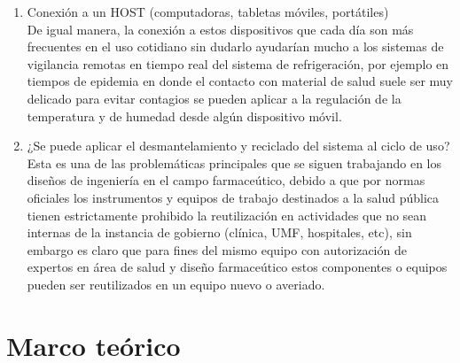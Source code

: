 \begin{enumerate}
\item	Conexión a un HOST (computadoras, tabletas móviles, portátiles)\\
De igual manera, la conexión a estos dispositivos que cada día son más frecuentes en el uso cotidiano sin dudarlo ayudarían mucho a los sistemas de vigilancia remotas en tiempo real del sistema de refrigeración, por ejemplo en tiempos de epidemia en donde el contacto con material de salud suele ser muy delicado para evitar contagios se pueden aplicar a la regulación de la temperatura y de humedad desde algún dispositivo móvil.



\item 	¿Se puede aplicar el desmantelamiento y reciclado del sistema al ciclo de uso?
Esta es una de las problemáticas principales que se siguen trabajando en los diseños de ingeniería en el campo farmaceútico, debido a que por normas oficiales los instrumentos y equipos de trabajo destinados a la salud pública tienen estrictamente prohibido la reutilización en actividades que no sean internas de la instancia de gobierno (clínica, UMF, hospitales, etc), sin embargo es claro que para fines del mismo equipo con autorización de expertos en área de salud y diseño farmaceútico estos componentes o equipos pueden ser reutilizados en un equipo nuevo o averiado.
	
\end{enumerate}


\section{Marco teórico }


